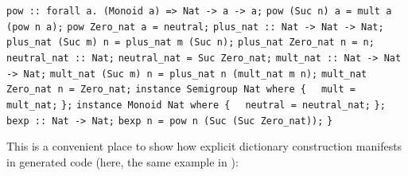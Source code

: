 \begin{isabellebody}
\begin{isamarkuptext}
\newline%
\verb|pow :: forall a. (Monoid a) => Nat -> a -> a;|\newline%
\verb|pow (Suc n) a = mult a (pow n a);|\newline%
\verb|pow Zero_nat a = neutral;|\newline%
\newline%
\verb|plus_nat :: Nat -> Nat -> Nat;|\newline%
\verb|plus_nat (Suc m) n = plus_nat m (Suc n);|\newline%
\verb|plus_nat Zero_nat n = n;|\newline%
\newline%
\verb|neutral_nat :: Nat;|\newline%
\verb|neutral_nat = Suc Zero_nat;|\newline%
\newline%
\verb|mult_nat :: Nat -> Nat -> Nat;|\newline%
\verb|mult_nat (Suc m) n = plus_nat n (mult_nat m n);|\newline%
\verb|mult_nat Zero_nat n = Zero_nat;|\newline%
\newline%
\verb|instance Semigroup Nat where {|\newline%
\verb|  mult = mult_nat;|\newline%
\verb|};|\newline%
\newline%
\verb|instance Monoid Nat where {|\newline%
\verb|  neutral = neutral_nat;|\newline%
\verb|};|\newline%
\newline%
\verb|bexp :: Nat -> Nat;|\newline%
\verb|bexp n = pow n (Suc (Suc Zero_nat));|\newline%
\newline%
\verb|}|%
\end{isamarkuptext}%
\isamarkuptrue%
%
\endisatagquoteme
{\isafoldquoteme}%
%
\isadelimquoteme
%
\endisadelimquoteme
%
\begin{isamarkuptext}%
\noindent This is a convenient place to show how explicit dictionary construction
  manifests in generated code (here, the same example in ):%
\end{isamarkuptext}%
\isamarkuptrue%
%
\isadelimquoteme
%
\endisadelimquoteme
%
\isatagquoteme
%
\begin{isamarkuptext}%
\isaverbatim%
\noindent%

\end{isamarkuptext}
\end{isabellebody}
